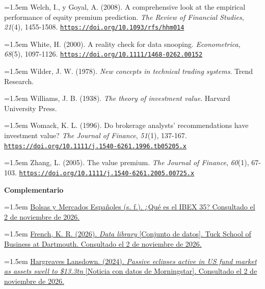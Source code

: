 \documentclass[10pt,a4paper]{article}
\begin{document}
\noindent\hangindent=1.5em Welch, I., y Goyal, A. (2008). A comprehensive look at the empirical performance of equity premium prediction. \textit{The Review of Financial Studies}, \textit{21}(4), 1455-1508. \href{https://doi.org/10.1093/rfs/hhm014}{\nolinkurl{https://doi.org/10.1093/rfs/hhm014}}

\noindent\hangindent=1.5em White, H. (2000). A reality check for data snooping. \textit{Econometrica}, \textit{68}(5), 1097-1126. \href{https://doi.org/10.1111/1468-0262.00152}{\nolinkurl{https://doi.org/10.1111/1468-0262.00152}}

\noindent\hangindent=1.5em Wilder, J. W. (1978). \textit{New concepts in technical trading systems}. Trend Research.

\noindent\hangindent=1.5em Williams, J. B. (1938). \textit{The theory of investment value}. Harvard University Press.

\noindent\hangindent=1.5em Womack, K. L. (1996). Do brokerage analysts' recommendations have investment value? \textit{The Journal of Finance}, \textit{51}(1), 137-167. \href{https://doi.org/10.1111/j.1540-6261.1996.tb05205.x}{\nolinkurl{https://doi.org/10.1111/j.1540-6261.1996.tb05205.x}}

{\sloppy\noindent\hangindent=1.5em Zhang, L. (2005). The value premium. \textit{The Journal of Finance}, \textit{60}(1), 67-103. \href{https://doi.org/10.1111/j.1540-6261.2005.00725.x}{\nolinkurl{https://doi.org/10.1111/j.1540-6261.2005.00725.x}}\par}

\textbf{Complementario}

\noindent\hangindent=1.5em \href{https://www.bolsasymercados.es/es/bme-exchange/preguntas-frecuentes/que-es-ibex35.html}{Bolsas y Mercados Españoles (s. f.). ¿Qué es el IBEX 35? Consultado el 2 de noviembre de 2026.}

\noindent\hangindent=1.5em \href{https://mba.tuck.dartmouth.edu/pages/faculty/ken.french/data_library.html}{French, K. R. (2026). \textit{Data library} [Conjunto de datos]. Tuck School of Business at Dartmouth. Consultado el 2 de noviembre de 2026.}

\noindent\hangindent=1.5em \href{https://www.hl.co.uk/news/passive-eclipses-active-in-us-fund-market-as-assets-swell-to-133tn}{Hargreaves Lansdown. (2024). \textit{Passive eclipses active in US fund market as assets swell to \$13.3tn} [Noticia con datos de Morningstar]. Consultado el 2 de noviembre de 2026.}
\end{document}
